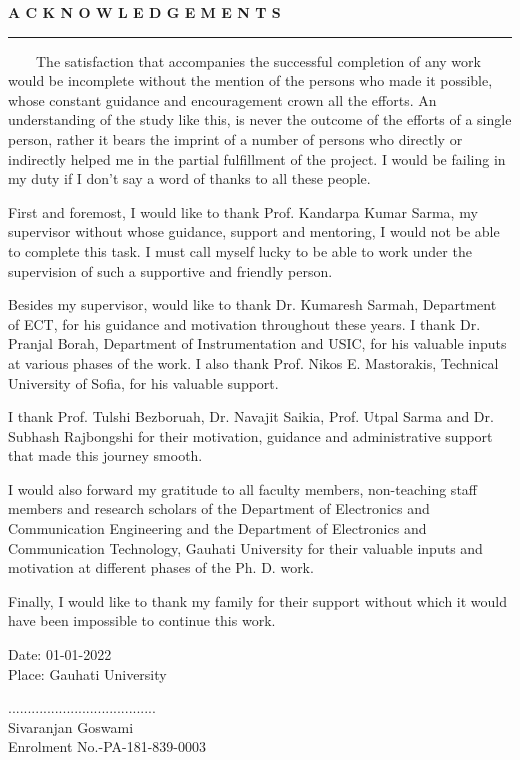 \begin{center}
{\bf \large A C K N O W L E D G E M E N T S}
\end{center}
\rule{\linewidth}{2mm} \pagestyle{empty} \vspace{0.25in}

~~~~The satisfaction that accompanies the successful completion of any work would be incomplete without the mention of the persons who made it possible, whose constant guidance and encouragement crown all the efforts. An understanding of the study like this, is never the outcome of the efforts of a single person, rather it bears the imprint of a number of persons who directly or indirectly helped me in the partial fulfillment of the project. I would be failing in my duty if I don't say a word of thanks to all these people.

First and foremost, I would like to thank Prof. Kandarpa Kumar Sarma, my supervisor without whose guidance, support and mentoring, I would not be able to complete this task. I must call myself lucky to be able to work under the supervision of such a supportive and friendly person.

Besides my supervisor, would like to thank Dr. Kumaresh Sarmah, Department of ECT, for his guidance and motivation throughout these years. I thank Dr. Pranjal Borah, Department of Instrumentation and USIC, for his valuable inputs at various phases of the work. I also thank Prof. Nikos E. Mastorakis, Technical University of Sofia, for his valuable support.

I thank Prof. Tulshi Bezboruah, Dr. Navajit Saikia, Prof. Utpal Sarma and Dr. Subhash Rajbongshi for their motivation, guidance and administrative support that made this journey smooth.

I would also forward my gratitude to all faculty members, non-teaching staff members and research scholars of the Department of Electronics and Communication Engineering and the Department of Electronics and Communication Technology, Gauhati University for their valuable inputs and motivation at different phases of the Ph. D. work.

Finally, I would like to thank my family for their support without which it would have been impossible to continue this work.

\vspace*{11mm}





\goodbreak
\begin{multicols}{2}
\begin{flushleft}
Date: 01-01-2022 \\
Place: Gauhati University \\
\end{flushleft}

\begin{flushright}
...................................... \\
Sivaranjan Goswami \\
Enrolment No.-PA-181-839-0003\\
\end{flushright}
\end{multicols}
